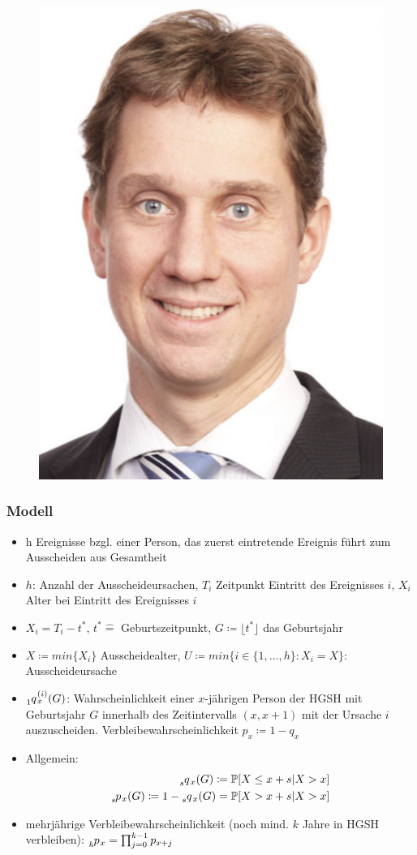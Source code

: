 \documentclass[12pt]{report}
\theoremstyle{dotless}
\theoremstyle{definition}
\begin{document}
\begin{figure}[ht]
	\centering
	\includegraphics[width=.8\textwidth]{Bilder/Korbinian.png}
\end{figure}

\subsubsection{Modell}
\begin{itemize}
	\item h Ereignisse bzgl. einer Person, das zuerst eintretende Ereignis führt zum Ausscheiden aus Gesamtheit
	\item $h$: Anzahl der Ausscheideursachen, $T_i$ Zeitpunkt Eintritt des Ereignisses $i$, $X_i$ Alter bei Eintritt des Ereignisses $i$
	\item $X_i = T_i-t^*$, $t^* \hat{=}$ Geburtszeitpunkt, $G \coloneqq \lfloor t^* \rfloor$ das Geburtsjahr
	\item $X\coloneqq min\{X_i\}$ Ausscheidealter, $U\coloneqq min\{i \in \{1,...,h\}:X_i=X\}$: Ausscheideursache
	\item $\tensor[_{1}]{q}{}_x^{(i)}(G)$: Wahrscheinlichkeit einer $x$-jährigen Person der HGSH mit Geburtsjahr $G$ innerhalb des Zeitintervalls $(x,x+1)$ mit der Ursache $i$ auszuscheiden. Verbleibewahrscheinlichkeit $p_x \coloneqq 1-q_x$
	\item Allgemein: 
	\begin{align}
		\tensor[_{s}]{q}{}_x(G)\coloneqq \mathbb{P}[X \leq x+s | X>x] \\
		\tensor[_{s}]{p}{}_x(G) \coloneqq 1-\tensor[_{s}]{q}{}_x(G) = \mathbb{P}[X>x+s|X>x]
	\end{align}
	\item mehrjährige Verbleibewahrscheinlichkeit (noch mind. $k$ Jahre in HGSH verbleiben): $\tensor[_{k}]{p}{}_x = \prod_{j=0}^{k-1}p_{x+j}$
\end{itemize}
\end{document}
